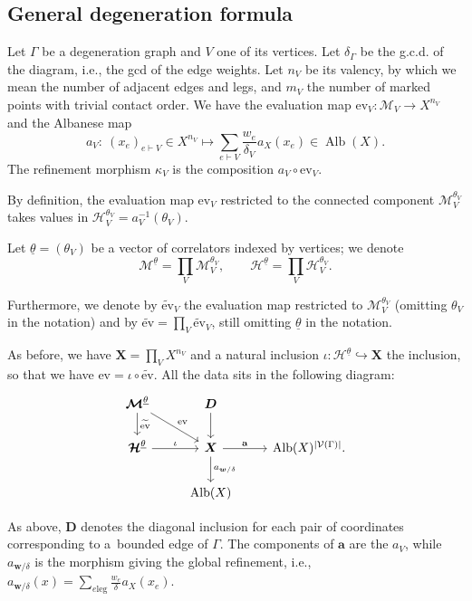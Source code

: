 \documentclass[pdftex]{sigma}
\newcommand{\ev}{\mathrm{ev}}
\newcommand{\Alb}{\operatorname{Alb}}
\newcommand{\btheta}{ {\underline{\theta}} }
\newcommand{\bfX}{ {\boldsymbol X} }
\newcommand{\bfD}{ {\boldsymbol D} }
\newcommand{\bfw}{ {\boldsymbol w} }
\newcommand{\M}{\mathcal{M}}
\newcommand{\V}{\mathcal{V}}
\renewcommand{\H}{\mathcal{H}}
\numberwithin{equation}{section}
\theoremstyle{definition}
\begin{document}
 \subsection{General degeneration formula}

Let $\Gamma$ be a degeneration graph and $V$ one of its vertices. Let $\delta_\Gamma$ be the g.c.d. of the diagram, i.e., the gcd of the edge weights. Let $n_V$ be its valency, by which we mean the number of adjacent edges and legs, and $m_V$ the number of marked points with trivial contact order. We have the evaluation map
$\ev_V \colon \M_V \to X^{n_V}$
and the Albanese map
\[ a_V\colon\ (x_e)_{e\vdash V}\in X^{n_V}\longmapsto \sum_{e\vdash V}\frac{w_e}{\delta_V}a_X(x_e)\in\Alb(X). \]
The refinement morphism $\kappa_V$ is the composition $a_V\circ\ev_V$.

By definition, the evaluation map $\ev_V$ restricted to the connected component $\M_V^{\theta_V}$ takes values in
$\H_V^{\theta_V}=a_V^{-1}(\theta_V)$.

Let $\btheta=(\theta_V)$ be a vector of correlators indexed by vertices; we denote
\[\boldsymbol{\M}^\btheta=\prod_V \M_V^{\theta_V},\qquad \boldsymbol{\H}^\btheta=\prod_V \H_V^{\theta_V}.\]

Furthermore, we denote by $\widetilde{\ev}_V$ the evaluation map restricted to $\M_V^{\theta_V}$ (omitting $\theta_V$ in the notation) and by $\widetilde{\ev}=\prod_V \widetilde{\ev}_V$, still omitting $\btheta$ in the notation.

As before, we have $\boldsymbol{X}=\prod_V X^{n_V}$ and a natural inclusion $\iota\colon \boldsymbol{\H}^\btheta\hookrightarrow\boldsymbol{X}$ the inclusion, so that we have $\ev=\iota\circ\widetilde{\ev}$. All the data sits in the following diagram:
\[ \begin{tikzcd}
\boldsymbol{\M}^\btheta \arrow[d,"\widetilde{\ev}"] \arrow[rd,"\ev"] & \bfD \arrow[d] & \\
\boldsymbol{\H}^\btheta \arrow[r,"\iota"] & \bfX \arrow[d,"a_{\bfw/\delta}"]\arrow[r,"\mathbf{a}"] & \Alb(X)^{|\V(\Gamma)|}. \\
 & \Alb(X) &
\end{tikzcd} \]

As above, $\bfD$ denotes the diagonal inclusion for each pair of coordinates corresponding to a~bounded edge of $\Gamma$. The components of $\mathbf{a}$ are the $a_V$, while $a_{\bfw/\delta}$ is the morphism giving the global refinement, i.e.,
$a_{\bfw/\delta}(x)=\sum_{e \text{leg}} \frac{w_e}{\delta}a_X(x_e)$.
\end{document}
